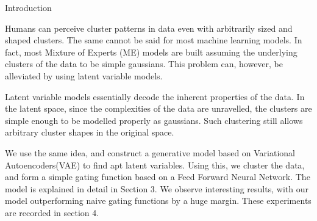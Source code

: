 \documentclass{article}
\begin{document}
\makeheader


\begin{psection}{Introduction}

	Humans can perceive cluster patterns in data even with arbitrarily sized and shaped clusters. The same cannot be said for most machine learning models. In fact, most Mixture of Experts (ME) models are built assuming the underlying clusters of the data to be simple gaussians. This problem can, however, be alleviated by using latent variable models.

	Latent variable models essentially decode the inherent properties of the data. In the latent space, since the complexities of the data are unravelled, the clusters are simple enough to be modelled properly as gaussians. Such clustering still allows arbitrary cluster shapes in the original space.

	We use the same idea, and construct a generative model based on Variational Autoencoders(VAE) to find apt latent variables. Using this, we cluster the data, and form a simple gating function based on a Feed Forward Neural Network. The model is explained in detail in Section 3. We observe interesting results, with our model outperforming naive gating functions by a huge margin. These experiments are recorded in section 4.

\end{psection}
\end{document}
